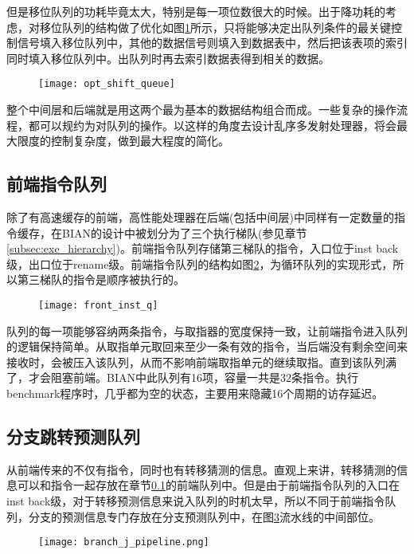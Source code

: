 但是移位队列的功耗毕竟太大，特别是每一项位数很大的时候。出于降功耗的考虑，对移位队列的结构做了优化如图\ref{fig:opt_shift_q}所示，只将能够决定出队列条件的最关键控制信号填入移位队列中，其他的数据信号则填入到数据表中，然后把该表项的索引同时填入移位队列中。出队列时再去索引数据表得到相关的数据。
\begin{figure}[!htbp]
	\centering
	\texttt{[image: opt\_shift\_queue]}
	\label{fig:opt_shift_q}
\end{figure}


整个中间层和后端就是用这两个最为基本的数据结构组合而成。一些复杂的操作流程，都可以规约为对队列的操作。以这样的角度去设计乱序多发射处理器，将会最大限度的控制复杂度，做到最大程度的简化。

\subsection{前端指令队列}\label{subsec:frontq}
除了有高速缓存的前端，高性能处理器在后端(包括中间层)中同样有一定数量的指令缓存，在BIAN的设计中被划分为了三个执行梯队(参见章节\ref{subsec:exe_hierarchy})。前端指令队列存储第三梯队的指令，入口位于inst back级，出口位于rename级。前端指令队列的结构如图\ref{fig:front_q}，为循环队列的实现形式，所以第三梯队的指令是顺序被执行的。
\begin{figure}[!htbp]
	\centering
	\texttt{[image: front\_inst\_q]}
	\label{fig:front_q}
\end{figure}

队列的每一项能够容纳两条指令，与取指器的宽度保持一致，让前端指令进入队列的逻辑保持简单。从取指单元取回来至少一条有效的指令，当后端没有剩余空间来接收时，会被压入该队列，从而不影响前端取指单元的继续取指。直到该队列满了，才会阻塞前端。BIAN中此队列有16项，容量一共是32条指令。执行benchmark程序时，几乎都为空的状态，主要用来隐藏16个周期的访存延迟。

\subsection{分支跳转预测队列}

从前端传来的不仅有指令，同时也有转移猜测的信息。直观上来讲，转移猜测的信息可以和指令一起存放在章节\ref{subsec:frontq}的前端队列中。但是由于前端指令队列的入口在inst back级，对于转移预测信息来说入队列的时机太早，所以不同于前端指令队列，分支的预测信息专门存放在分支预测队列中，在图\ref{fig:predict_q}流水线的中间部位。
\begin{figure}[!htbp]
	\centering
	\texttt{[image: branch\_j\_pipeline.png]}
	\label{fig:predict_q}
\end{figure}


